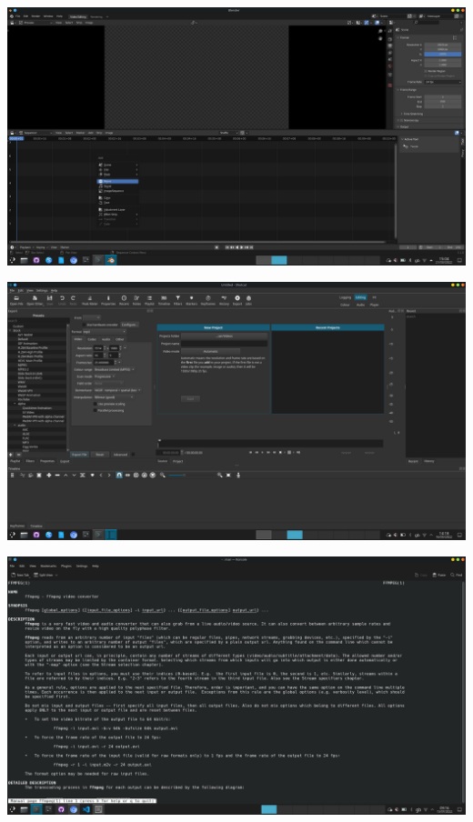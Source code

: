 \documentclass[11pt]{report}
\begin{document}
\begin{minipage}{.5\textwidth}
	\includegraphics[width=1\linewidth]{blenderVideoEditor}
\end{minipage}
\begin{minipage}{.5\textwidth}
	\includegraphics[width=1\linewidth]{shotcut}
\end{minipage}
\begin{minipage}{.5\textwidth}
	\includegraphics[width=1\linewidth]{ffmpeg}
\end{minipage}
\end{document}

